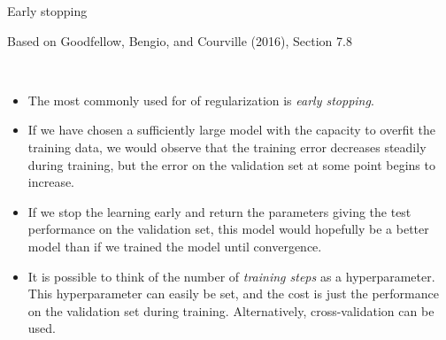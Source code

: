 \documentclass[10pt,ignorenonframetext,]{beamer}
\providecommand{\tightlist}{%
  \setlength{\itemsep}{0pt}\setlength{\parskip}{0pt}}
\begin{document}
\begin{frame}

\begin{block}{Early stopping}

\tiny Based on Goodfellow, Bengio, and Courville (2016), Section 7.8

\normalsize

\(~\)

\begin{itemize}
\tightlist
\item
  The most commonly used for of regularization is \emph{early stopping}.
\end{itemize}

\vspace{2mm}

\begin{itemize}
\tightlist
\item
  If we have chosen a sufficiently large model with the capacity to
  overfit the training data, we would observe that the training error
  decreases steadily during training, but the error on the validation
  set at some point begins to increase.
\end{itemize}

\vspace{2mm}

\begin{itemize}
\tightlist
\item
  If we stop the learning early and return the parameters giving the
  test performance on the validation set, this model would hopefully be
  a better model than if we trained the model until convergence.
\end{itemize}

\vspace{2mm}

\begin{itemize}
\tightlist
\item
  It is possible to think of the number of \emph{training steps} as a
  hyperparameter. This hyperparameter can easily be set, and the cost is
  just the performance on the validation set during training.
  Alternatively, cross-validation can be used.
\end{itemize}

\end{block}

\end{frame}
\end{document}
